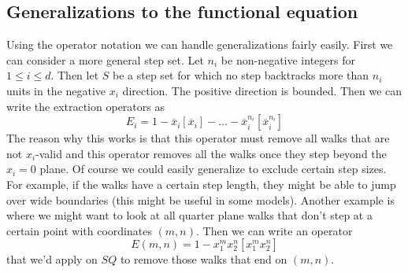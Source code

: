 \documentclass[12pt]{article}
\theoremstyle{definition} \newtheorem{definition}[theorem]{Definition}
\newcommand{\ol}[1]{\overline{#1}}
\begin{document}
\subsection{Generalizations to the functional equation}
Using the operator notation we can handle generalizations fairly easily. First we can consider a more general step set. Let $n_i$ be non-negative integers for $1\leq i \leq d$. Then let $S$ be a step set for which no step backtracks more than $n_i$ units in the negative $x_i$ direction. The positive direction is bounded. Then we can write the extraction operators as
\[
E_ i =1-\ol{x}_i[\ol{x}_i]-\ldots -\ol{x}_i^{n_i}[\ol{x}_i^{n_i}]
\]
The reason why this works is that this operator must remove all walks that are not $x_i$-valid and this operator removes all the walks once they step beyond the $x_i = 0$ plane. Of course we could easily generalize to exclude certain step sizes. For example, if the walks have a certain step length, they might be able to jump over wide boundaries (this might be useful in some models). Another example is where we might want to look at all quarter plane walks that don't step at a certain point with coordinates $(m,n)$. Then we can write an operator
\[
   E(m,n)= 1- x_1^m x_2^n [x_1^m x_2^n]
\]
that we'd apply on $SQ$ to remove those walks that end on $(m,n)$.
\end{document}
